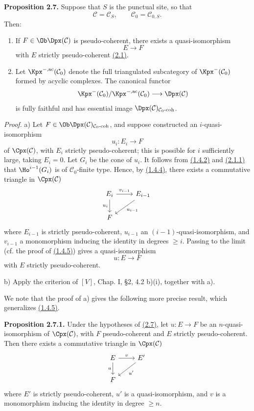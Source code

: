 \textbf{Proposition 2.7.} Suppose that \(S\) is the punctual site, so that
\[
  \mathcal C=\mathcal C_S,\qquad \mathcal C_0=\mathcal C_{0,S}.
\]
Then:
\begin{enumerate}[label=\alph*)]
\item If \(F\in\Ob\Dpx(\mathcal C)\) is pseudo-coherent, there exists a quasi-isomorphism
\[
  E\longrightarrow F
\]
with \(E\) strictly pseudo-coherent \hyperlink{sga6.e01.def.2-1}{(2.1)}.
\item Let \(\Kpx^{-,\mathrm{ac}}(\mathcal C_0)\) denote the full triangulated subcategory of \(\Kpx^-(\mathcal C_0)\) formed by acyclic complexes. The canonical functor
\[
  \Kpx^-(\mathcal C_0)/\Kpx^{-,\mathrm{ac}}(\mathcal C_0)
  \longrightarrow \Dpx(\mathcal C)
\]
is fully faithful and has essential image \(\Dpx(\mathcal C)_{\mathcal C_0\text{-}\mathrm{coh}}\).
\end{enumerate}

\emph{Proof.} a) Let \(F\in\Ob\Dpx(\mathcal C)_{\mathcal C_0\text{-}\mathrm{coh}}\), and suppose constructed an \(i\)-quasi-isomorphism
\[
  u_i:E_i\longrightarrow F
\]
of \(\Cpx(\mathcal C)\), with \(E_i\) strictly pseudo-coherent; this is possible for \(i\) sufficiently large, taking \(E_i=0\). Let \(G_i\) be the cone of \(u_i\). It follows from \hyperlink{sga6.e01.lem.1-4-2}{(1.4.2)} and \hyperlink{sga6.e01.lem.2-1-1}{(2.1.1)} that \(\Ho^{i-1}(G_i)\) is of \(\mathcal C_0\)-finite type. Hence, by \hyperlink{sga6.e01.cor.1-4-4}{(1.4.4)}, there exists a commutative triangle in \(\Cpx(\mathcal C)\)
\[
\begin{tikzcd}
E_i \arrow[r,"v_{i-1}"] \arrow[d,"u_i"'] & E_{i-1} \arrow[dl,"u_{i-1}"]\\
F &
\end{tikzcd}
\]
where \(E_{i-1}\) is strictly pseudo-coherent, \(u_{i-1}\) an \((i-1)\)-quasi-isomorphism, and \(v_{i-1}\) a monomorphism inducing the identity in degrees \(\geq i\). Passing to the limit (cf. the proof of \hyperlink{sga6.e01.cor.1-4-5}{(1.4.5)}) gives a quasi-isomorphism
\[
  u:E\longrightarrow F
\]
with \(E\) strictly pseudo-coherent.

b) Apply the criterion of \([V]\), Chap. I, §2, 4.2 b)(i), together with a).

We note that the proof of a) gives the following more precise result, which generalizes \hyperlink{sga6.e01.cor.1-4-5}{(1.4.5)}.

\textbf{Proposition 2.7.1.} Under the hypotheses of \hyperlink{sga6.e01.prop.2-7}{(2.7)}, let \(u:E\to F\) be an \(n\)-quasi-isomorphism of \(\Cpx(\mathcal C)\), with \(F\) pseudo-coherent and \(E\) strictly pseudo-coherent. Then there exists a commutative triangle in \(\Cpx(\mathcal C)\)
\[
\begin{tikzcd}
E \arrow[r,"v"] \arrow[d,"u"'] & E' \arrow[dl,"u'"]\\
F &
\end{tikzcd}
\]
where \(E'\) is strictly pseudo-coherent, \(u'\) is a quasi-isomorphism, and \(v\) is a monomorphism inducing the identity in degree \(\geq n\).


